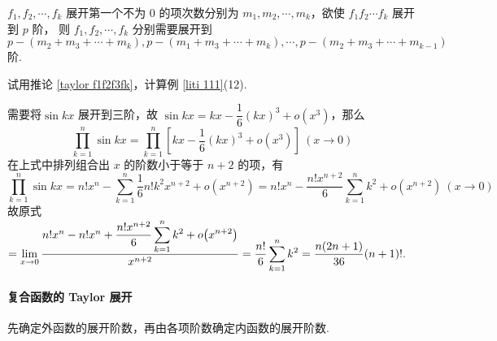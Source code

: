 \begin{inference}
    $f_1,f_2,\cdots,f_k$ 展开第一个不为 0 的项次数分别为 $m_1,m_2,\cdots,m_k$，欲使 $f_1f_2\cdots f_k$ 展开到 $p$ 阶，
    则 $f_1,f_2,\cdots,f_k$ 分别需要展开到 $p-(m_2+m_3+\cdots+m_k),p-(m_1+m_3+\cdots+m_k),\cdots,p-(m_2+m_3+\cdots+m_{k-1})$ 阶.
    \label{taylor f1f2f3fk}
\end{inference}
\begin{example}
    \scriptsize\linespread{0.8}
    试用推论 \ref{taylor f1f2f3fk}，计算例 \ref{liti 111}(12).
\end{example}
\begin{solution}
    \scriptsize\linespread{0.8}
    需要将$\sin kx$ 展开到三阶，故 $\sin kx=kx-\dfrac{1}{6}(kx)^3+o(x^3)$，那么
    $$\prod_{k=1}^{n}\sin kx=\prod_{k=1}^{n}\left[kx-\dfrac{1}{6}(kx)^3+o(x^3)\right]~ (x\to0)$$
    在上式中排列组合出 $x$ 的阶数小于等于 $n+2$ 的项，有
    $$\prod_{k=1}^{n}\sin kx=n!x^n-\sum_{k=1}^{n}\dfrac{1}{6}n!k^2x^{n+2}+o(x^{n+2})=n!x^n-\dfrac{n!x^{n+2}}{6}\sum_{k=1}^{n}k^2+o(x^{n+2})~ (x\to0)$$
    故原式$\displaystyle=\lim\limits_{x\to0}\dfrac{n!x^n-n!x^n+\dfrac{n!x^{n+2}}{6}\displaystyle\sum\limits_{k=1}^{n}k^2+o\qty(x^{n+2})}{x^{n+2}}=\dfrac{n!}{6}\sum_{k=1}^{n}k^2=\dfrac{n(2n+1)}{36}(n+1)!.$
\end{solution}

\paragraph{复合函数的 Taylor 展开}
先确定外函数的展开阶数，再由各项阶数确定内函数的展开阶数.

